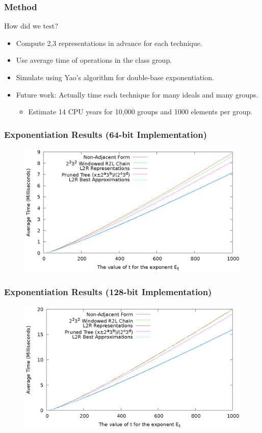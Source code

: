 \documentclass{beamer}
\begin{document}
\begin{frame}
\frametitle{Method}
How did we test?
\begin{itemize}
\item Compute 2,3 representations in advance for each technique.
\item Use average time of operations in the class group.
\item Simulate using Yao's algorithm for double-base exponentiation.
\item Future work: Actually time each technique for many ideals and many groups.
	\begin{itemize}
	\item Estimate 14 CPU years for 10,000 groups and 1000 elements per group.
	\end{itemize}
\end{itemize}
\end{frame}

\begin{frame}
\frametitle{Exponentiation Results (64-bit Implementation)}
\begin{figure}
\includegraphics[scale=0.86]{pow-winners-64}
\end{figure}
\end{frame}
\begin{frame}
\frametitle{Exponentiation Results (128-bit Implementation)}
\begin{figure}
\includegraphics[scale=0.86]{pow-winners-128}
\end{figure}
\end{frame}
\end{document}
